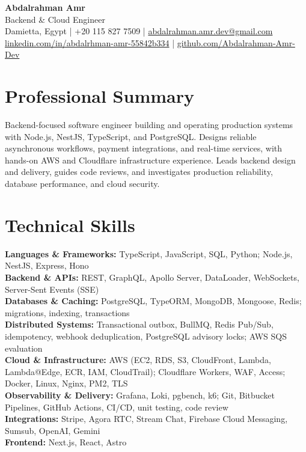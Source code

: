 \documentclass[a4paper,10pt]{article}
\begin{document}
\begin{center}
{\LARGE\bfseries Abdalrahman Amr}\\[3pt]
{\large Backend \& Cloud Engineer}\\[4pt]
Damietta, Egypt | +20 115 827 7509 | \href{mailto:abdalrahman.amr.dev@gmail.com}{abdalrahman.amr.dev@gmail.com}\\[2pt]
\href{https://www.linkedin.com/in/abdalrhman-amr-55842b334/}{linkedin.com/in/abdalrhman-amr-55842b334} | \href{https://github.com/Abdalrahman-Amr-Dev}{github.com/Abdalrahman-Amr-Dev}
\end{center}

\section{Professional Summary}
Backend-focused software engineer building and operating production systems with Node.js, NestJS, TypeScript, and PostgreSQL. Designs reliable asynchronous workflows, payment integrations, and real-time services, with hands-on AWS and Cloudflare infrastructure experience. Leads backend design and delivery, guides code reviews, and investigates production reliability, database performance, and cloud security.

\section{Technical Skills}
\textbf{Languages \& Frameworks:} TypeScript, JavaScript, SQL, Python; Node.js, NestJS, Express, Hono\\
\textbf{Backend \& APIs:} REST, GraphQL, Apollo Server, DataLoader, WebSockets, Server-Sent Events (SSE)\\
\textbf{Databases \& Caching:} PostgreSQL, TypeORM, MongoDB, Mongoose, Redis; migrations, indexing, transactions\\
\textbf{Distributed Systems:} Transactional outbox, BullMQ, Redis Pub/Sub, idempotency, webhook deduplication, PostgreSQL advisory locks; AWS SQS evaluation\\
\textbf{Cloud \& Infrastructure:} AWS (EC2, RDS, S3, CloudFront, Lambda, Lambda@Edge, ECR, IAM, CloudTrail); Cloudflare Workers, WAF, Access; Docker, Linux, Nginx, PM2, TLS\\
\textbf{Observability \& Delivery:} Grafana, Loki, pgbench, k6; Git, Bitbucket Pipelines, GitHub Actions, CI/CD, unit testing, code review\\
\textbf{Integrations:} Stripe, Agora RTC, Stream Chat, Firebase Cloud Messaging, Sumsub, OpenAI, Gemini\\
\textbf{Frontend:} Next.js, React, Astro
\end{document}
